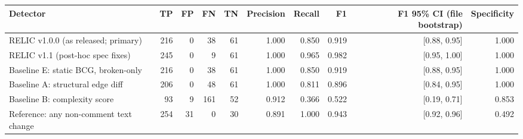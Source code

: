 \begin{tabular}{lrrrrrrrrr}
\toprule
Detector & TP & FP & FN & TN & Precision & Recall & F1 & F1 95\% CI (file bootstrap) & Specificity \\
\midrule
RELIC v1.0.0 (as released; primary) & 216 & 0 & 38 & 61 & 1.000 & 0.850 & 0.919 & [0.88, 0.95] & 1.000 \\
RELIC v1.1 (post-hoc spec fixes) & 245 & 0 & 9 & 61 & 1.000 & 0.965 & 0.982 & [0.95, 1.00] & 1.000 \\
Baseline E: static BCG, broken-only & 216 & 0 & 38 & 61 & 1.000 & 0.850 & 0.919 & [0.88, 0.95] & 1.000 \\
Baseline A: structural edge diff & 206 & 0 & 48 & 61 & 1.000 & 0.811 & 0.896 & [0.84, 0.95] & 1.000 \\
Baseline B: complexity score & 93 & 9 & 161 & 52 & 0.912 & 0.366 & 0.522 & [0.19, 0.71] & 0.853 \\
Reference: any non-comment text change & 254 & 31 & 0 & 30 & 0.891 & 1.000 & 0.943 & [0.92, 0.96] & 0.492 \\
\bottomrule
\end{tabular}
